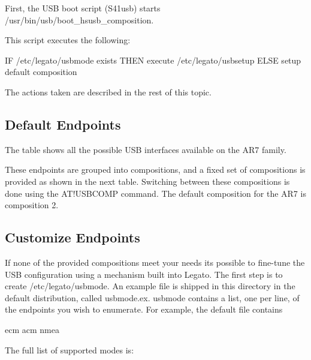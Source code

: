 First, the U\+S\+B boot script ({\ttfamily S41usb}) starts {\ttfamily /usr/bin/usb/boot\+\_\+hsusb\+\_\+composition}.

This script executes the following\+: \begin{DoxyVerb}IF /etc/legato/usbmode exists
THEN execute /etc/legato/usbsetup
ELSE setup default composition
\end{DoxyVerb}


The actions taken are described in the rest of this topic.\hypertarget{how_to_customize_u_s_b_howToCustomizeUSB_defaultEndpoints}{}\subsection{Default Endpoints}\label{how_to_customize_u_s_b_howToCustomizeUSB_defaultEndpoints}
The table shows all the possible U\+S\+B interfaces available on the A\+R7 family.



These endpoints are grouped into compositions, and a fixed set of compositions is provided as shown in the next table. Switching between these compositions is done using the {\ttfamily A\+T!\+U\+S\+B\+C\+O\+M\+P} command. The default composition for the A\+R7 is composition 2.

\hypertarget{how_to_customize_u_s_b_howToCustomizeUSB_customizeEndpoints}{}\subsection{Customize Endpoints}\label{how_to_customize_u_s_b_howToCustomizeUSB_customizeEndpoints}
If none of the provided compositions meet your needs it\textquotesingle{}s possible to fine-\/tune the U\+S\+B configuration using a mechanism built into Legato. The first step is to create {\ttfamily /etc/legato/usbmode}. An example file is shipped in this directory in the default distribution, called {\ttfamily usbmode.\+ex}. {\ttfamily usbmode} contains a list, one per line, of the endpoints you wish to enumerate. For example, the default file contains

\begin{DoxyVerb}ecm
acm
nmea
\end{DoxyVerb}


The full list of supported modes is\+:

